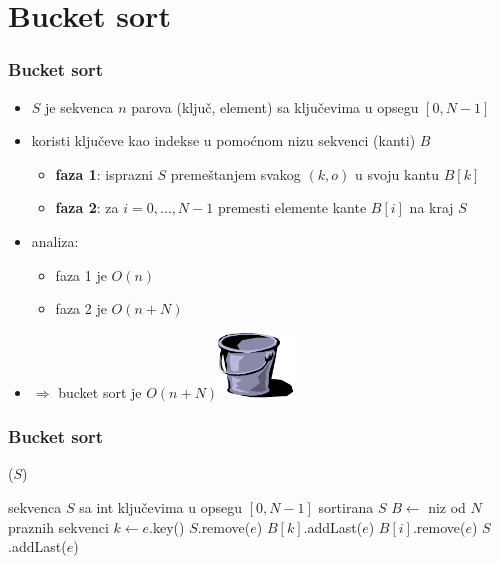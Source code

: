 \documentclass[compress]{beamer}
\begin{document}
\section[Bucket sort]{Bucket sort}

\begin{frame}[fragile]
  \frametitle{Bucket sort}
  \begin{itemize}
    \item $S$ je sekvenca $n$ parova (ključ, element) sa ključevima u opsegu $[0, N-1]$
    \item {} koristi ključeve kao indekse u pomoćnom nizu sekvenci (kanti) $B$
    \begin{itemize}
      \item \textbf{faza 1}: isprazni $S$ premeštanjem svakog $(k,o)$ u svoju kantu $B[k]$ 
      \item \textbf{faza 2}: za $i=0,\ldots,N-1$ premesti elemente kante $B[i]$ na kraj $S$ 
    \end{itemize}
    \item analiza:
    \begin{itemize}
      \item faza 1 je $O(n)$ 
      \item faza 2 je $O(n+N)$ 
    \end{itemize}
    \item $\Rightarrow$ bucket sort je $O(n+N)$\hfill\includegraphics[width=2cm]{asp-12-pic31.png}
  \end{itemize}
\end{frame}

\begin{frame}
  \frametitle{Bucket sort}
  ($S$)
  \begin{algorithmic}
    \REQUIRE sekvenca $S$ sa int ključevima u opsegu $[0,N-1]$
    \ENSURE sortirana $S$
    \STATE $B \leftarrow$ niz od $N$ praznih sekvenci
      \STATE $k \leftarrow e$.key()
      \STATE $S$.remove($e$)
      \STATE $B[k]$.addLast($e$) 
    \ENDFOR
        \STATE $B[i]$.remove($e$)
        \STATE $S$.addLast($e$)
      \ENDFOR
    \ENDFOR
  \end{algorithmic}
\end{frame}
\end{document}
